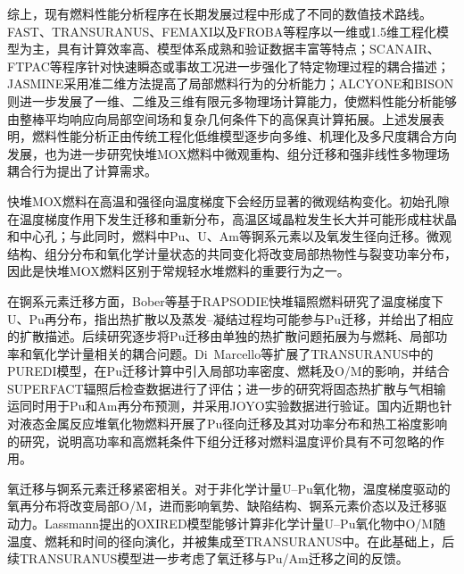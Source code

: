 综上，现有燃料性能分析程序在长期发展过程中形成了不同的数值技术路线。FAST、TRANSURANUS、FEMAXI以及FROBA等程序以一维或1.5维工程化模型为主，具有计算效率高、模型体系成熟和验证数据丰富等特点；SCANAIR、FTPAC等程序针对快速瞬态或事故工况进一步强化了特定物理过程的耦合描述；JASMINE采用准二维方法提高了局部燃料行为的分析能力；ALCYONE和BISON则进一步发展了一维、二维及三维有限元多物理场计算能力，使燃料性能分析能够由整棒平均响应向局部空间场和复杂几何条件下的高保真计算拓展。上述发展表明，燃料性能分析正由传统工程化低维模型逐步向多维、机理化及多尺度耦合方向发展，也为进一步研究快堆MOX燃料中微观重构、组分迁移和强非线性多物理场耦合行为提出了计算需求。


快堆MOX燃料在高温和强径向温度梯度下会经历显著的微观结构变化。初始孔隙在温度梯度作用下发生迁移和重新分布，高温区域晶粒发生长大并可能形成柱状晶和中心孔；与此同时，燃料中Pu、U、Am等锕系元素以及氧发生径向迁移。微观结构、组分分布和氧化学计量状态的共同变化将改变局部热物性与裂变功率分布，因此是快堆MOX燃料区别于常规轻水堆燃料的重要行为之一\cite{parrishReviewMicrostructuralFeatures2018}。

在锕系元素迁移方面，Bober等\cite{boberPlutoniumRedistributionFast1973}基于RAPSODIE快堆辐照燃料研究了温度梯度下U、Pu再分布，指出热扩散以及蒸发--凝结过程均可能参与Pu迁移，并给出了相应的扩散描述。后续研究逐步将Pu迁移由单独的热扩散问题拓展为与燃耗、局部功率和氧化学计量相关的耦合问题。Di~Marcello等\cite{dimarcelloExtensionTRANSURANUSPlutonium2012}扩展了TRANSURANUS中的PUREDI模型，在Pu迁移计算中引入局部功率密度、燃耗及O/M的影响，并结合SUPERFACT辐照后检查数据进行了评估；进一步的研究将固态热扩散与气相输运同时用于Pu和Am再分布预测，并采用JOYO实验数据进行验证\cite{dimarcelloModellingActinideRedistribution2014}。国内近期也针对液态金属反应堆氧化物燃料开展了Pu径向迁移及其对功率分布和热工裕度影响的研究，说明高功率和高燃耗条件下组分迁移对燃料温度评价具有不可忽略的作用\cite{xuStudyAnalysisPlutonium2025}。

氧迁移与锕系元素迁移紧密相关。对于非化学计量U--Pu氧化物，温度梯度驱动的氧再分布将改变局部O/M，进而影响氧势、缺陷结构、锕系元素价态以及迁移驱动力。Lassmann提出的OXIRED模型能够计算非化学计量U--Pu氧化物中O/M随温度、燃耗和时间的径向演化，并被集成至TRANSURANUS中\cite{lassmannOxiredModelRedistribution1987}。在此基础上，后续TRANSURANUS模型进一步考虑了氧迁移与Pu/Am迁移之间的反馈\cite{dimarcelloExtensionTRANSURANUSPlutonium2012,dimarcelloModellingActinideRedistribution2014}。

